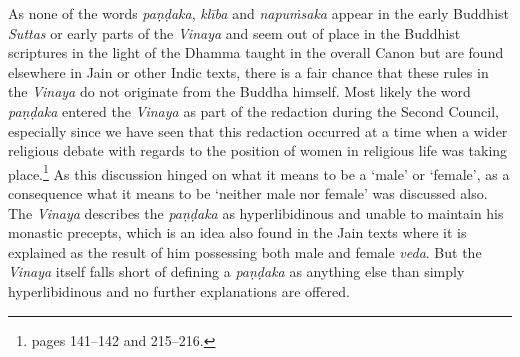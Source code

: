 As none of the words \textit{paṇḍaka}, \textit{klība} and \textit{napuṁsaka} appear in the early Buddhist \textit{Suttas} or early parts of the \textit{Vinaya} and seem out of place in the Buddhist scriptures in the light of the Dhamma taught in the overall Canon but are found elsewhere in Jain or other Indic texts, there is a fair chance that these rules in the \textit{Vinaya} do not originate from the Buddha himself. Most likely the word \textit{paṇḍaka} entered the \textit{Vinaya} as part of the redaction during the Second Council, especially since we have seen that this redaction occurred at a time when a wider religious debate with regards to the position of women in religious life was taking place.\footnote{\cite{sujato2009} pages 141–142 and 215–216.} As this discussion hinged on what it means to be a `male' or `female', as a consequence what it means to be `neither male nor female' was discussed also. The \textit{Vinaya} describes the \textit{paṇḍaka} as hyperlibidinous and unable to maintain his monastic precepts, which is an idea also found in the Jain texts where it is explained as the result of him possessing both male and female \textit{veda}. But the \textit{Vinaya} itself falls short of defining a \textit{paṇḍaka} as anything else than simply hyperlibidinous and no further explanations are offered. 

